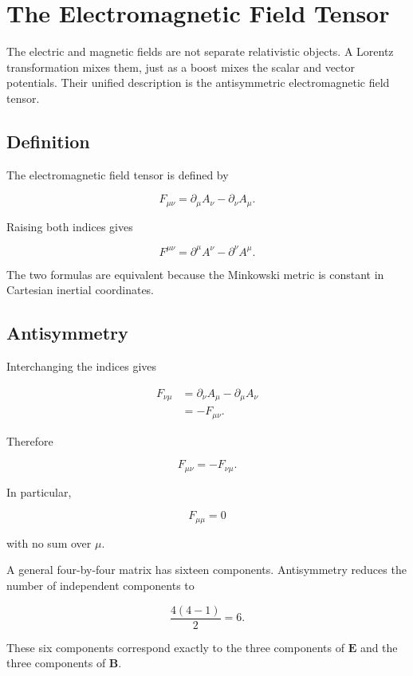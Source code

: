 \section{The Electromagnetic Field Tensor}
\label{sec:electromagnetic_field_tensor}

The electric and magnetic fields are not separate relativistic objects. A Lorentz transformation mixes them, just as a boost mixes the scalar and vector potentials. Their unified description is the antisymmetric electromagnetic field tensor.

\subsection{Definition}

The electromagnetic field tensor is defined by

\[
\boxed{
F_{\mu\nu}
=
\partial_{\mu}A_{\nu}
-
\partial_{\nu}A_{\mu}
}.
\]

Raising both indices gives

\[
\boxed{
F^{\mu\nu}
=
\partial^{\mu}A^{\nu}
-
\partial^{\nu}A^{\mu}
}.
\]

The two formulas are equivalent because the Minkowski metric is constant in Cartesian inertial coordinates.

\subsection{Antisymmetry}

Interchanging the indices gives

\[
\begin{aligned}
F_{\nu\mu}
&=
\partial_{\nu}A_{\mu}
-
\partial_{\mu}A_{\nu}\\
&=
-F_{\mu\nu}.
\end{aligned}
\]

Therefore

\[
\boxed{
F_{\mu\nu}
=
-F_{\nu\mu}
}.
\]

In particular,

\[
F_{\mu\mu}=0
\]

with no sum over \(\mu\).

A general four-by-four matrix has sixteen components. Antisymmetry reduces the number of independent components to

\[
\frac{4(4-1)}{2}=6.
\]

These six components correspond exactly to the three components of \(\mathbf{E}\) and the three components of \(\mathbf{B}\).


